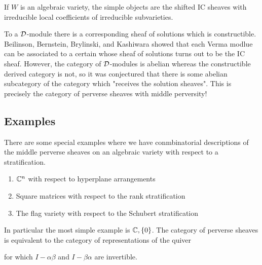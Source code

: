 \begin{theorem}
    If $W$ is an algebraic variety, the simple objects 
    are the shifted IC sheaves with irreducible local coefficients of irreducible 
    subvarieties.
\end{theorem}

\begin{remark}
    To a ${\mathcal{D}}$-module there is a corresponding sheaf of solutions which 
    is constructible. Beilinson, Bernstein, Brylinski, and Kashiwara showed that
    each Verma modlue can be associated to a certain 
     whose sheaf of solutions 
    turns out to be the IC sheaf. However,
    the category of ${\mathcal{D}}$-modules is abelian whereas the constructible
    derived category is not, so it was conjectured that there is some abelian subcategory of the 
    category which "receives the solution sheaves". This is precisely
    the category of perverse sheaves with middle perversity!
\end{remark}

\subsection{Examples}
\begin{example}
There are some special examples where we have conmbinatorial descriptions of the
middle perverse sheaves on an algebraic variety with respect to a
stratification. \begin{enumerate}
    \item $\mathbb{C}^n$ with respect to hyperplane arrangements
    \item Square matrices with respect to the rank stratification
    \item The flag variety with respect to the Schubert stratification
\end{enumerate}
In particular the most simple example is $\mathbb{C}, \{0\}$. The category of perverse
sheaves is equivalent to the category of representations of the quiver \begin{center}
\end{center} for which $I-\alpha\beta$ and $I-\beta\alpha$ are invertible.
\end{example}

